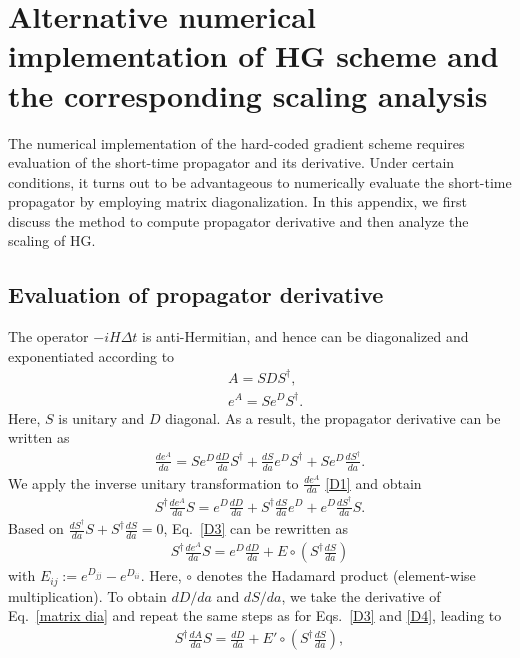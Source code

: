 \section{Alternative numerical implementation of HG scheme and the corresponding scaling analysis}
\label{scalingmatrixdiag}
The numerical implementation of the hard-coded gradient scheme requires evaluation of the short-time propagator and its derivative. Under certain conditions, it turns out to be advantageous to numerically evaluate the short-time propagator by employing matrix diagonalization. In this appendix, we first discuss the method to compute propagator derivative and then analyze the scaling of HG.


\subsection{Evaluation of propagator derivative }
The operator $-iH\Delta t$ is anti-Hermitian, and hence can be diagonalized and exponentiated according to 
\begin{align}
\label{matrix dia}    &A=SDS^\dagger,\\
    &e^A=Se^DS^\dagger.
\end{align}
Here, $S$ is unitary and $D$ diagonal. As a result, the propagator derivative can be written as
\begin{align}
\label{D1}
    \frac{d e^{A}}{d a}=Se^D\frac{dD}{da}S^\dagger+\frac{dS}{da}e^DS^\dagger+Se^D\frac{dS^\dagger}{da}.
\end{align}
We apply the inverse unitary transformation to $\frac{d e^{A}}{d a}$ \eqref{D1} and obtain
\begin{align}
\label{D3}
    S^\dagger\frac{de^A}{da}S=e^D\frac{dD}{da}+S^\dagger\frac{dS}{da}e^D+e^D\frac{dS^\dagger}{da}S.
\end{align}
Based on $\frac{dS^\dagger}{da}S+S^\dagger\frac{dS}{da}=0$, Eq.\ \eqref{D3} can be rewritten as 
\begin{align}
\label{D4}
    S^\dagger \frac{de^A}{da}S=e^D\frac{dD}{da}+E\circ(S^\dagger\frac{dS}{da})
\end{align}
with $E_{ij}:=e^{D_{jj}}-e^{D_{ii}}$. Here, $\circ$ denotes the Hadamard product (element-wise multiplication). To obtain $dD/da$ and $dS/da$, we take the derivative of Eq.\ \eqref{matrix dia} and repeat the same steps as for Eqs.\ \eqref{D3} and \eqref{D4}, leading to
\begin{align}
\label{D5}
    S^\dagger\frac{dA}{da}S=\frac{dD}{da}+E'\circ(S^\dagger\frac{dS}{da}),
\end{align}
